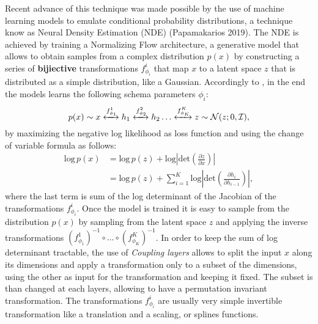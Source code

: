 Recent advance of this technique was made possible by the use of machine learning models to emulate conditional probability distributions, a technique know as Neural Density Estimation (NDE) (Papamakarios 2019). The NDE is achieved by training a Normalizing Flow architecture, a generative model that allows to obtain samples from a complex distribution $p(x)$ by constructing a series of \textbf{bijiective} transformations  $f_{\phi_i}^i$ that map $x$ to a latent space $z$ that is distributed as a simple distribution, like a Gaussian. Accordingly to \cite{kingmaGlowGenerativeFlow2018}, in the end the models learns the following schema parameters $\phi_i$:
\begin{equation}
p(x) \sim x \xleftrightarrow{\text{$f_{\phi_1}^1$}} h_1 \xleftrightarrow{\text{$f_{\phi_2}^2$}} h_2 \dots \xleftrightarrow{\text{$f_{\phi_K}^K$}} z \sim \mathcal{N}(z; 0, \mathcal{I}),
\end{equation}
by maximizing the negative log likelihood as loss function and using the change of variable formula as follows:
\begin{equation}
\begin{aligned}
    \text{log} \, p(x) &= \text{log} \, p(z) + \text{log} \left| \text{det} \left( \frac{\partial z}{\partial x} \right) \right| \\
    &= \text{log} \, p(z) + \sum_{i=1}^K \text{log} \left| \text{det} \left( \frac{\partial h_{i}}{\partial h_{i-1}} \right) \right| ,
\end{aligned}
\end{equation}
where the last term is sum of the log determinant of the Jacobian of the transformations $f_{\phi_i}^i$. Once the model is trained it is easy to sample from the distribution $p(x)$ by sampling from the latent space $z$ and applying the inverse transformations $(f_{\phi_1}^1)^{-1} \circ \dots \circ (f_{\phi_K}^K)^{-1}$.
In order to keep the sum of log determinant tractable, the use of \textit{Coupling layers} allows to split the input $x$ along its dimensions and apply a transformation only to a subset of the dimensions, using the other as input for the transformation and keeping it fixed. The subset is than changed at each layers, allowing to have a permutation invariant transformation. The transformations $f^{i}_{\phi_i}$ are usually very simple invertible transformation like a translation and a scaling, or splines functions. 

